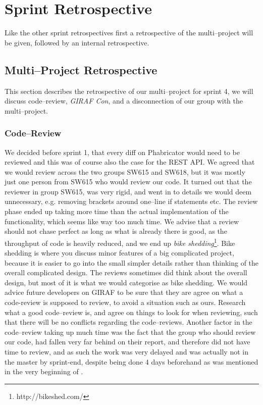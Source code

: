 \section{Sprint Retrospective}
\label{sec:S4retro} %

Like the other sprint retrospectives first a retrospective of the multi--project will be given, followed by an internal retrospective.

\subsection*{Multi--Project Retrospective}
This section describes the retrospective of our multi--project for sprint 4, we will discuss code--review, \textit{GIRAF Con}, and a disconnection of our group with the multi--project.

\subsubsection*{Code--Review}
We decided before sprint 1, that every diff on Phabricator would need to be reviewed and this was of course also the case for the REST API.
We agreed that we would review across the two groups SW615 and SW618, but it was mostly just one person from SW615 who would review our code.
It turned out that the reviewer in group SW615, was very rigid, and went in to details we would deem unnecessary, e.g. removing brackets around one--line if statements etc.
The review phase ended up taking more time than the actual implementation of the functionality, which seems like way too much time.
We advise that a review should not chase perfect as long as what is already there is good, as the throughput of code is heavily reduced, and we end up \textit{bike shedding}\footnote{http://bikeshed.com/}.
Bike shedding is where you discuss minor features of a big complicated project, because it is easier to go into the small simpler details rather than thinking of the overall complicated design.
The reviews sometimes did think about the overall design, but most of it is what we would categorise as bike shedding.
We would advice future developers on GIRAF to be sure that they are agree on what a code-review is supposed to review, to avoid a situation such as ours.
Research what a good code--review is, and agree on things to look for when reviewing, such that there will be no conflicts regarding the code--reviews.
Another factor in the code--review taking up much time was the fact that the group who should review our code, had fallen very far behind on their report, and therefore did not have time to review, and as such the work was very delayed and was actually not in the master by sprint-end, despite being done 4 days beforehand as was mentioned in the very beginning of .


